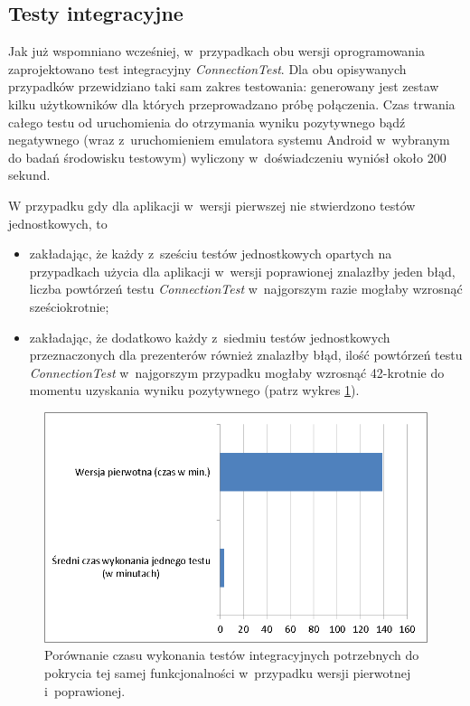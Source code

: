 \subsection{Testy integracyjne}
Jak już wspomniano wcześniej, w~przypadkach obu wersji oprogramowania zaprojektowano test integracyjny \textit{ConnectionTest}. Dla obu opisywanych przypadków przewidziano taki sam zakres testowania: generowany jest zestaw kilku użytkowników dla których przeprowadzano próbę połączenia. Czas trwania całego testu od uruchomienia do otrzymania wyniku pozytywnego bądź negatywnego (wraz z~uruchomieniem emulatora systemu Android w~wybranym do badań środowisku testowym) wyliczony w~doświadczeniu wyniósł około 200 sekund. 

W przypadku gdy dla aplikacji w~wersji pierwszej nie stwierdzono testów jednostkowych, to
\begin{itemize}
\item
zakładając, że każdy z~sześciu testów jednostkowych opartych na przypadkach użycia dla aplikacji w~wersji poprawionej znalazłby jeden błąd, liczba powtórzeń testu \textit{ConnectionTest} w~najgorszym razie mogłaby wzrosnąć sześciokrotnie;
\item
zakładając, że dodatkowo każdy z~siedmiu testów jednostkowych przeznaczonych dla prezenterów również znalazłby błąd, ilość powtórzeń testu \textit{ConnectionTest} w~najgorszym przypadku mogłaby wzrosnąć 42-krotnie do momentu uzyskania wyniku pozytywnego (patrz wykres \ref{fig:app_int_czas}).
\end{itemize}
\begin{figure}[!htb]
    \centering
    \includegraphics[width=12cm]{imgs/ch6_app_int_czas.png}
    \caption
{Porównanie czasu wykonania testów integracyjnych potrzebnych do pokrycia tej samej funkcjonalności w~przypadku wersji pierwotnej i~poprawionej. }
    \label{fig:app_int_czas}
\end{figure} 

